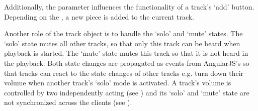 Additionally, the  parameter influences the functionality of a track's `add' button. Depending on the , a new piece is added to the current track.

Another role of the track object is to handle the `solo' and `mute' states. The `solo' state mutes all other tracks, so that only this track can be heard when playback is started. The `mute' state mutes this track so that it is not heard in the playback. Both state changes are propagated as events from AngularJS's  so that tracks can react to the state changes of other tracks e.g. turn down their volume when another track's `solo' mode is activated. A track's volume is controlled by two independently acting  (see ) and its `solo' and `mute' state are not synchronized across the clients (see ).